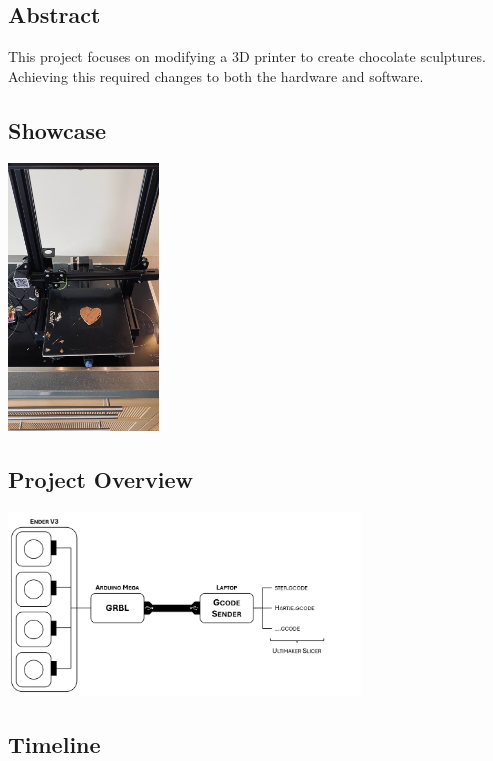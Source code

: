 \subsection{Abstract}

This project focuses on modifying a 3D printer to create chocolate sculptures.
Achieving this required changes to both the hardware and software.

\subsection{Showcase}

\begin{center}
    \includegraphics[width=0.3\textwidth]{introduction/hart.jpg}
\end{center}

\subsection{Project Overview}


\begin{center}
    \includegraphics[width=0.7\textwidth]{introduction/overview.png}
\end{center}

\subsection{Timeline}
